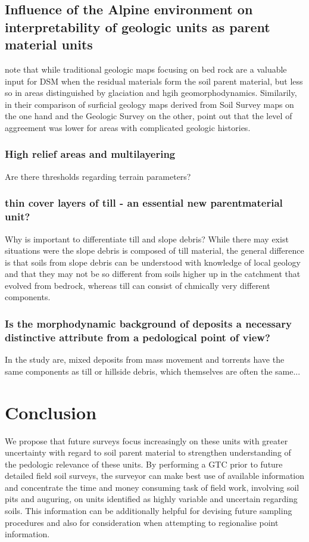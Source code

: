 \documentclass[preprint,12pt,authoryear]{elsarticle}
\begin{document}
\subsection{Influence of the Alpine environment on interpretability of geologic units as parent material units}
\cite{Heung2014} note that while traditional geologic maps focusing on bed rock are a valuable input for DSM when the residual materials form the soil parent material, but less so in areas distinguished by glaciation and hgih geomorphodynamics. Similarily, in their comparison of surficial geology maps derived from Soil Survey maps on the one hand and the Geologic Survey on the other, \cite{Miller2015a} point out that the level of aggreement was lower for areas with complicated geologic histories.

\subsubsection{High relief areas and multilayering}
Are there thresholds regarding terrain parameters?
\subsubsection{thin cover layers of till - an essential new parentmaterial unit?}
Why is important to differentiate till and slope debris? While there may exist situations were the slope debris is composed of till material, the general difference is that soils from slope debris can be understood with knowledge of local geology and that they may not be so different from soils higher up in the catchment that evolved from bedrock, whereas till can consist of chmically very different components.
\subsubsection{Is the morphodynamic background of deposits a necessary distinctive attribute from a pedological point of view?}
In the study are, mixed deposits from mass movement and torrents have the same components as till or hillside debris, which themselves are often the same...



\section{Conclusion}
We propose that future surveys focus increasingly on these units with greater uncertainty with regard to soil parent material to strengthen understanding of the pedologic relevance of these units. By performing a GTC prior to future detailed field soil surveys, the surveyor can make best use of available information and concentrate the time and money consuming task of field work, involving soil pits and auguring, on units identified as highly variable and uncertain regarding soils. This information can be additionally helpful for devising future sampling procedures and also for consideration when attempting to regionalise point information.
\end{document}
